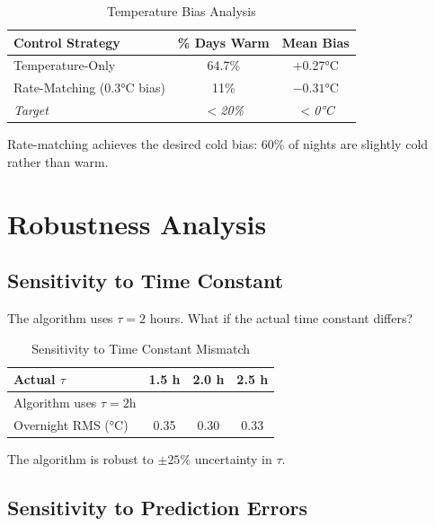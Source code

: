 \documentclass[11pt,letterpaper]{article}
\begin{document}
\begin{table}[H]
\centering
\caption{Temperature Bias Analysis}
\label{tab:bias}
\begin{tabular}{l|cc}
\toprule
\textbf{Control Strategy} & \textbf{\% Days Warm} & \textbf{Mean Bias} \\
\midrule
Temperature-Only & 64.7\% & +0.27°C \\
\rowcolor{bestcolor}
Rate-Matching (0.3°C bias) & 11\% & $-0.31$°C \\
\midrule
\textit{Target} & \textit{$<$20\%} & \textit{$<$0°C} \\
\bottomrule
\end{tabular}
\end{table}

Rate-matching achieves the desired cold bias: 60\% of nights are slightly cold rather than warm.

\section{Robustness Analysis}

\subsection{Sensitivity to Time Constant}

The algorithm uses $\tau = 2$ hours. What if the actual time constant differs?

\begin{table}[H]
\centering
\caption{Sensitivity to Time Constant Mismatch}
\label{tab:tau}
\begin{tabular}{l|ccc}
\toprule
\textbf{Actual $\tau$} & \textbf{1.5 h} & \textbf{2.0 h} & \textbf{2.5 h} \\
\midrule
Algorithm uses $\tau=2$h & & & \\
Overnight RMS (°C) & 0.35 & 0.30 & 0.33 \\
\bottomrule
\end{tabular}
\end{table}

The algorithm is robust to $\pm 25\%$ uncertainty in $\tau$.

\subsection{Sensitivity to Prediction Errors}
\end{document}
